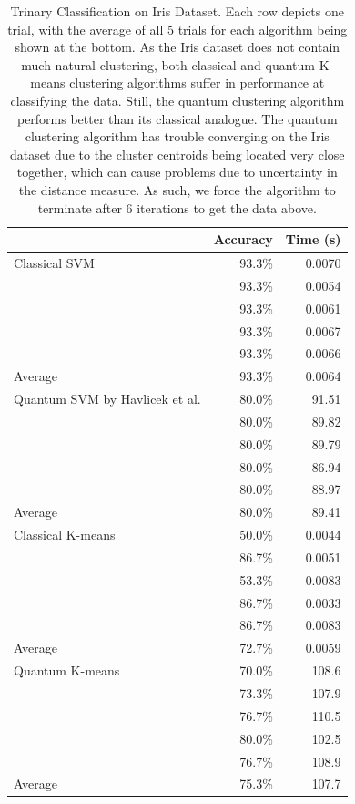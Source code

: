 \documentclass[twocolumn, english]{revtex4-2}
\begin{document}
\begin{table}
\begin{tabular}{l|r|r}
&Accuracy&Time (s)\\
\hline
Classical SVM&93.3\%&0.0070\\
\cline{2-3}
&93.3\%&0.0054\\
\cline{2-3}
&93.3\%&0.0061\\
\cline{2-3}
&93.3\%&0.0067\\
\cline{2-3}
&93.3\%&0.0066\\
\hline\hline
Average&93.3\%&0.0064\\
\hline\hline
Quantum SVM by Havlicek et al.&80.0\%&91.51\\
\cline{2-3}
&80.0\%&89.82\\
\cline{2-3}
&80.0\%&89.79\\
\cline{2-3}
&80.0\%&86.94\\
\cline{2-3}
&80.0\%&88.97\\
\hline\hline
Average&80.0\%&89.41\\
\hline\hline
Classical K-means&50.0\%&0.0044\\
\cline{2-3}
&86.7\%&0.0051\\
\cline{2-3}
&53.3\%&0.0083\\
\cline{2-3}
&86.7\%&0.0033\\
\cline{2-3}
&86.7\%&0.0083\\
\hline\hline
Average&72.7\%&0.0059\\
\hline\hline
Quantum K-means&70.0\%&108.6\\
\cline{2-3}
&73.3\%&107.9\\
\cline{2-3}
&76.7\%&110.5\\
\cline{2-3}
&80.0\%&102.5\\
\cline{2-3}
&76.7\%&108.9\\
\hline\hline
Average&75.3\%&107.7\\
\hline\hline
\end{tabular}
\caption{Trinary Classification on Iris Dataset. Each row depicts one trial, with the average of all 5 trials for each algorithm being shown at the bottom. As the Iris dataset does not contain much natural clustering, both classical and quantum K-means clustering algorithms suffer in performance at classifying the data. Still, the quantum clustering algorithm performs better than its classical analogue. The quantum clustering algorithm has trouble converging on the Iris dataset due to the cluster centroids being located very close together, which can cause problems due to uncertainty in the distance measure. As such, we force the algorithm to terminate after 6 iterations to get the data above.}
\end{table}
\end{document}

